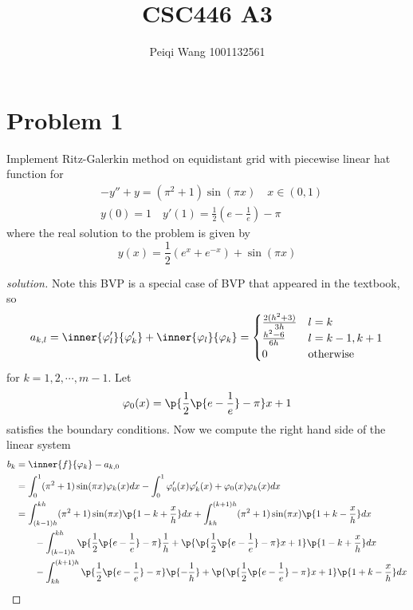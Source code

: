 \documentclass[11pt]{article}
\title{CSC446 A3}
\author{Peiqi Wang 1001132561}
\begin{document}
\maketitle


\section*{Problem 1} 
Implement Ritz-Galerkin method on equidistant grid with piecewise linear hat function for
\begin{align*}
    &-y'' + y = (\pi^2 + 1) \sin (\pi x) \quad x\in(0,1) \\
    &y(0) = 1\quad y'(1) = \frac{1}{2} (e-\frac{1}{e}) -\pi
\end{align*}
where the real solution to the problem is given by 
\[
    y(x) = \frac{1}{2} (e^x + e^{-x}) + \sin (\pi x)
\]
\begin{proof}[solution]
    Note this BVP is a special case of BVP that appeared in the textbook, so 
    \begin{align*}
        a_{k,l} 
        = \inner{\varphi_l'}{\varphi_k'} + \inner{\varphi_l}{\varphi_k}
        = \begin{cases}
            \frac{2(h^2+3)}{3h} & l=k \\
            \frac{h^2-6}{6h} & l = k-1,k+1 \\
            0 & \text{otherwise} \\
        \end{cases}
    \end{align*}
    for $k=1,2,\cdots, m-1$. Let 
    \[
        \varphi_0(x) = \p{\frac{1}{2} \p{e - \frac{1}{e}} - \pi} x  + 1
    \]
    satisfies the boundary conditions. Now we compute the right hand side of the linear system
    \begin{align*}
        b_k
        &= \inner{f}{\varphi_k} - a_{k,0} \\
        &= \int_0^1 (\pi^2+1)\sin(\pi x) \varphi_k(x) dx 
            - \int_0^1 \varphi_{0}'(x) \varphi'_k(x) + \varphi_0(x) \varphi_k(x) dx \\
        &= 
            \int_{(k-1)h}^{kh} (\pi^2 + 1) \sin(\pi x) \p{ 1-k+\frac{x}{h} } dx
            +\int_{kh}^{(k+1)h} (\pi^2+1) \sin(\pi x) \p{ 1+k-\frac{x}{h} } dx \\
        &\quad\quad -\int_{(k-1)h}^{kh}\p{\frac{1}{2} \p{e - \frac{1}{e}} - \pi} \frac{1}{h} + \p{\p{\frac{1}{2} \p{e - \frac{1}{e}} - \pi}x + 1} \p{ 1-k+\frac{x}{h}} dx \\
        &\quad\quad -\int_{kh}^{(k+1)h} \p{\frac{1}{2} \p{e - \frac{1}{e}} - \pi} \p{-\frac{1}{h}} + \p{\p{\frac{1}{2} \p{e - \frac{1}{e}} - \pi}x + 1} \p{ 1+k-\frac{x}{h} } dx

\end{align*}
\end{proof}
\end{document}
